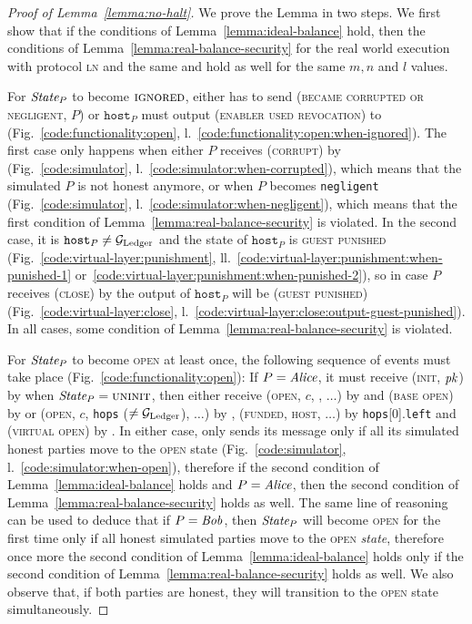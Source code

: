 \begin{proof}[Proof of Lemma~\ref{lemma:no-halt}]
  We prove the Lemma in two steps. We first show that if the conditions of
  Lemma~\ref{lemma:ideal-balance} hold, then the conditions of
  Lemma~\ref{lemma:real-balance-security} for the real world execution with
  protocol \textsc{ln} and the same \environment and \adversary hold as well for
  the same $m, n$ and $l$ values.

  For $\itistate_P$ to become $\textsc{ignored}$, either \simulator has to send
  (\textsc{became corrupted or negligent}, $P$) or $\texttt{host}_P$ must output
  (\textsc{enabler used revocation}) to \fchan
  (Fig.~\ref{code:functionality:open},
  l.~\ref{code:functionality:open:when-ignored}). The first case only happens
  when either $P$ receives (\textsc{corrupt}) by \adversary
  (Fig.~\ref{code:simulator}, l.~\ref{code:simulator:when-corrupted}), which
  means that the simulated $P$ is not honest anymore, or when $P$ becomes
  \texttt{negligent} (Fig.~\ref{code:simulator},
  l.~\ref{code:simulator:when-negligent}), which means that the first condition
  of Lemma~\ref{lemma:real-balance-security} is violated. In the second case, it
  is $\texttt{host}_P \neq \mathcal{G}_{\mathrm{Ledger}}$ and the state of $\texttt{host}_P$ is
  \textsc{guest punished} (Fig.~\ref{code:virtual-layer:punishment},
  ll.~\ref{code:virtual-layer:punishment:when-punished-1}
  or~\ref{code:virtual-layer:punishment:when-punished-2}), so in case $P$ receives
  (\textsc{close}) by \environment the output of $\texttt{host}_P$ will be
  (\textsc{guest punished}) (Fig.~\ref{code:virtual-layer:close},
  l.~\ref{code:virtual-layer:close:output-guest-punished}). In all cases, some
  condition of Lemma~\ref{lemma:real-balance-security} is violated.

  For $\itistate_P$ to become \textsc{open} at least once, the following
  sequence of events must take place (Fig.~\ref{code:functionality:open}): If $P
  = \mathit{Alice}$, it must receive (\textsc{init}, $\textit{pk}_{}$) by \environment when
  $\itistate_P = \textsc{uninit}$, then either receive (\textsc{open}, $c$,
  \ledger, $\dots$) by \environment and (\textsc{base open}) by \simulator or
  (\textsc{open}, $c$, \texttt{hops} ($\neq \mathcal{G}_{\mathrm{Ledger}}$), $\dots$) by \environment,
  (\textsc{funded}, \textsc{host}, $\dots$) by \texttt{hops}[0].\texttt{left}
  and (\textsc{virtual open}) by \simulator. In either case, \simulator only
  sends its message only if all its simulated honest parties move to the
  \textsc{open} state (Fig.~\ref{code:simulator},
  l.~\ref{code:simulator:when-open}), therefore if the second condition of
  Lemma~\ref{lemma:ideal-balance} holds and $P = \mathit{Alice}$, then the second
  condition of Lemma~\ref{lemma:real-balance-security} holds as well. The same
  line of reasoning can be used to deduce that if $P = \mathit{Bob}$, then $\itistate_P$
  will become \textsc{open} for the first time only if all honest simulated
  parties move to the \textsc{open} \textit{state}, therefore once more the
  second condition of Lemma~\ref{lemma:ideal-balance} holds only if the second
  condition of Lemma~\ref{lemma:real-balance-security} holds as well. We also
  observe that, if both parties are honest, they will transition to the
  \textsc{open} state simultaneously.


\end{proof}
